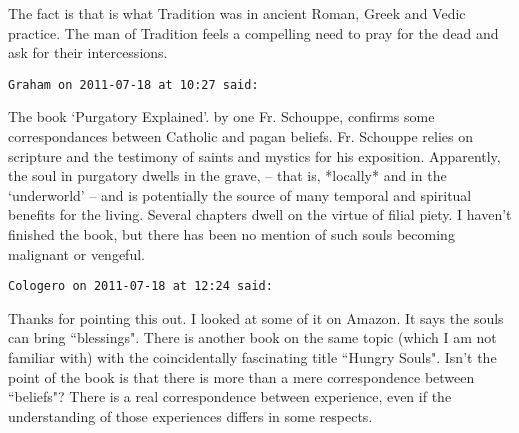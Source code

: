 \begin{footnotesize}
\begin{sffamily}
The fact is that is what Tradition was in ancient Roman, Greek and Vedic practice. The man of Tradition feels a compelling need to pray for the dead and ask for their intercessions.


\hfill

\texttt{Graham on 2011-07-18 at 10:27 said: }

The book `Purgatory Explained'. by one Fr. Schouppe, confirms some correspondances between Catholic and pagan beliefs. Fr. Schouppe relies on scripture and the testimony of saints and mystics for his exposition. Apparently, the soul in purgatory dwells in the grave, – that is, *locally* and in the `underworld’ – and is potentially the source of many temporal and spiritual benefits for the living. Several chapters dwell on the virtue of filial piety. I haven't finished the book, but there has been no mention of such souls becoming malignant or vengeful.


\hfill

\texttt{Cologero on 2011-07-18 at 12:24 said: }

Thanks for pointing this out. I looked at some of it on Amazon. It says the souls can bring ``blessings". There is another book on the same topic (which I am not familiar with) with the coincidentally fascinating title ``Hungry Souls". Isn't the point of the book is that there is more than a mere correspondence between ``beliefs"? There is a real correspondence between experience, even if the understanding of those experiences differs in some respects.


\end{sffamily}\end{footnotesize}
